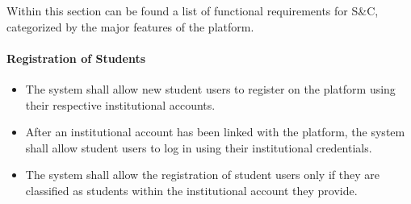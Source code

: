 




Within this section can be found a list of functional requirements for S\&C, categorized by the major features of the platform.

\paragraph{Registration of Students}
\begin{itemize}[label={[\textbf{FR}]}, align=left, leftmargin=*]
    \item {} The system shall allow new student users to register on the platform using their respective institutional accounts.
    \item {} After an institutional account has been linked with the platform, the system shall allow student users to log in using their institutional credentials.
    \item {} The system shall allow the registration of student users only if they are classified as students within the institutional account they provide.
\end{itemize}

